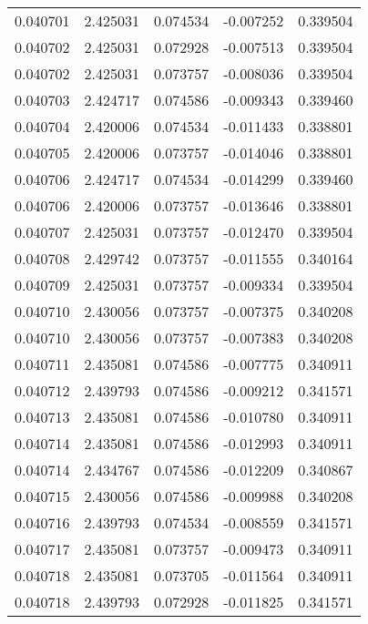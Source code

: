 \begin{tabular}{lrrrr}
0.040701    &  2.425031 &  0.074534 & -0.007252 &             0.339504 \\
0.040702    &  2.425031 &  0.072928 & -0.007513 &             0.339504 \\
0.040702    &  2.425031 &  0.073757 & -0.008036 &             0.339504 \\
0.040703    &  2.424717 &  0.074586 & -0.009343 &             0.339460 \\
0.040704    &  2.420006 &  0.074534 & -0.011433 &             0.338801 \\
0.040705    &  2.420006 &  0.073757 & -0.014046 &             0.338801 \\
0.040706    &  2.424717 &  0.074534 & -0.014299 &             0.339460 \\
0.040706    &  2.420006 &  0.073757 & -0.013646 &             0.338801 \\
0.040707    &  2.425031 &  0.073757 & -0.012470 &             0.339504 \\
0.040708    &  2.429742 &  0.073757 & -0.011555 &             0.340164 \\
0.040709    &  2.425031 &  0.073757 & -0.009334 &             0.339504 \\
0.040710    &  2.430056 &  0.073757 & -0.007375 &             0.340208 \\
0.040710    &  2.430056 &  0.073757 & -0.007383 &             0.340208 \\
0.040711    &  2.435081 &  0.074586 & -0.007775 &             0.340911 \\
0.040712    &  2.439793 &  0.074586 & -0.009212 &             0.341571 \\
0.040713    &  2.435081 &  0.074586 & -0.010780 &             0.340911 \\
0.040714    &  2.435081 &  0.074586 & -0.012993 &             0.340911 \\
0.040714    &  2.434767 &  0.074586 & -0.012209 &             0.340867 \\
0.040715    &  2.430056 &  0.074586 & -0.009988 &             0.340208 \\
0.040716    &  2.439793 &  0.074534 & -0.008559 &             0.341571 \\
0.040717    &  2.435081 &  0.073757 & -0.009473 &             0.340911 \\
0.040718    &  2.435081 &  0.073705 & -0.011564 &             0.340911 \\
0.040718    &  2.439793 &  0.072928 & -0.011825 &             0.341571 \\

\end{tabular}
